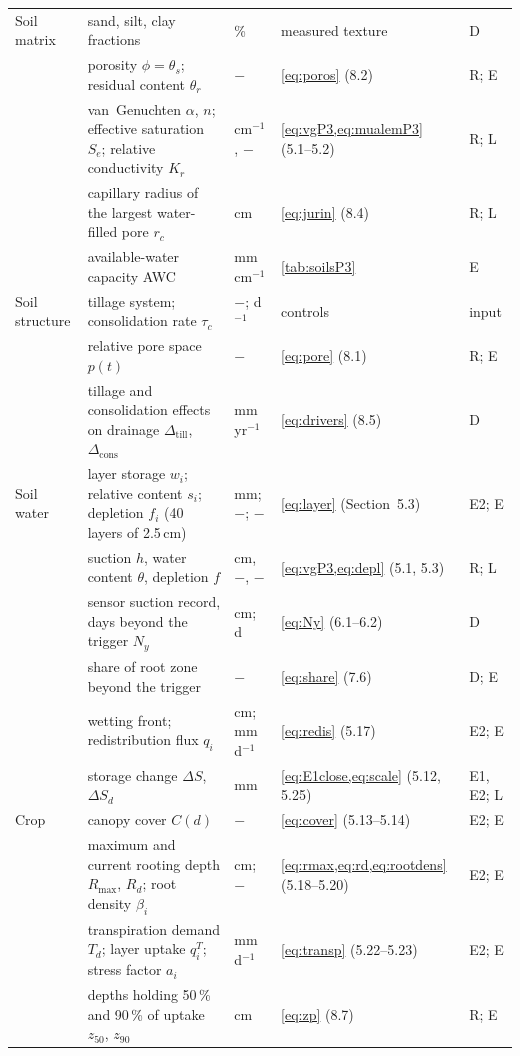 {\begin{longtable}{>{\raggedright\arraybackslash}p{2.3cm}>{\raggedright\arraybackslash}p{3.8cm}>{\raggedright\arraybackslash}p{1.8cm}>{\raggedright\arraybackslash}p{4.0cm}>{\raggedright\arraybackslash}p{1.9cm}}
Soil matrix & sand, silt, clay fractions & \% & measured texture & D\\
 & porosity $\phi=\theta_s$; residual content $\theta_r$ & $-$ & \cref{eq:poros} (8.2) & R; E\\
 & van~Genuchten $\alpha$, $n$; effective saturation $S_e$; relative conductivity $K_r$ & cm$^{-1}$, $-$ & \cref{eq:vgP3,eq:mualemP3} (5.1--5.2) & R; L\\
 & capillary radius of the largest water-filled pore $r_c$ & cm & \cref{eq:jurin} (8.4) & R; L\\
 & available-water capacity AWC & mm\,cm$^{-1}$ & \cref{tab:soilsP3} & E\\
Soil structure & tillage system; consolidation rate $\tau_c$ & $-$; d$^{-1}$ & controls & input\\
 & relative pore space $p(t)$ & $-$ & \cref{eq:pore} (8.1) & R; E\\
 & tillage and consolidation effects on drainage $\Delta_{\mathrm{till}}$, $\Delta_{\mathrm{cons}}$ & mm\,yr$^{-1}$ & \cref{eq:drivers} (8.5) & D\\
Soil water & layer storage $w_i$; relative content $s_i$; depletion $f_i$ (40 layers of 2.5\,cm) & mm; $-$; $-$ & \cref{eq:layer} (Section~5.3) & E2; E\\
 & suction $h$, water content $\theta$, depletion $f$ & cm, $-$, $-$ & \cref{eq:vgP3,eq:depl} (5.1, 5.3) & R; L\\
 & sensor suction record, days beyond the trigger $N_y$ & cm; d & \cref{eq:Ny} (6.1--6.2) & D\\
 & share of root zone beyond the trigger & $-$ & \cref{eq:share} (7.6) & D; E\\
 & wetting front; redistribution flux $q_i$ & cm; mm\,d$^{-1}$ & \cref{eq:redis} (5.17) & E2; E\\
 & storage change $\Delta S$, $\Delta S_d$ & mm & \cref{eq:E1close,eq:scale} (5.12, 5.25) & E1, E2; L\\
Crop & canopy cover $C(d)$ & $-$ & \cref{eq:cover} (5.13--5.14) & E2; E\\
 & maximum and current rooting depth $R_{\max}$, $R_d$; root density $\beta_i$ & cm; $-$ & \cref{eq:rmax,eq:rd,eq:rootdens} (5.18--5.20) & E2; E\\
 & transpiration demand $T_d$; layer uptake $q_i^{T}$; stress factor $a_i$ & mm\,d$^{-1}$ & \cref{eq:transp} (5.22--5.23) & E2; E\\
 & depths holding 50\,\% and 90\,\% of uptake $z_{50}$, $z_{90}$ & cm & \cref{eq:zp} (8.7) & R; E\\

\end{longtable}}

